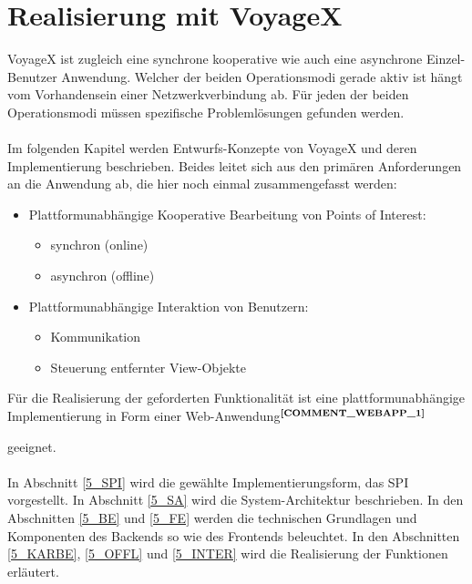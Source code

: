 \section{Realisierung mit VoyageX}
VoyageX ist zugleich eine synchrone kooperative wie auch eine asynchrone Einzel-Benutzer Anwendung. Welcher der beiden Operationsmodi gerade aktiv ist hängt vom Vorhandensein einer Netzwerkverbindung ab. Für jeden der beiden Operationsmodi müssen spezifische Problemlösungen gefunden werden.\\ \\
Im folgenden Kapitel werden Entwurfs-Konzepte von VoyageX und deren Implementierung beschrieben. Beides leitet sich aus den primären Anforderungen an die Anwendung ab, die hier noch einmal zusammengefasst werden:
	\begin{itemize}
		\item Plattformunabhängige Kooperative Bearbeitung von Points of Interest:
			\begin{itemize}
				\item synchron (online)
				\item asynchron (offline)
			\end{itemize}
		\item Plattformunabhängige Interaktion von Benutzern:
			\begin{itemize}
				\item Kommunikation
				\item Steuerung entfernter View-Objekte
			\end{itemize}
	\end{itemize}
Für die Realisierung der geforderten Funktionalität ist eine plattformunabhängige Implementierung in Form einer Web-Anwendung$^{\textbf{\ref{COMMENT_WEBAPP_1}}}$
\addtocounter{footnote}{1}
geeignet.\\ \\
In Abschnitt \ref{5_SPI} wird die gewählte Implementierungsform, das SPI vorgestellt. In Abschnitt \ref{5_SA} wird die System-Architektur beschrieben. In den Abschnitten \ref{5_BE} und  \ref{5_FE} werden die technischen Grundlagen und Komponenten des Backends so wie des Frontends beleuchtet. In den Abschnitten \ref{5_KARBE}, \ref{5_OFFL} und \ref{5_INTER} wird die Realisierung der Funktionen erläutert.

